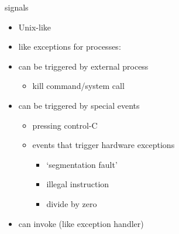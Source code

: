 \begin{frame}{signals}
\begin{itemize}
\item Unix-like 
\item like exceptions for processes:
\vspace{.5cm}
\item can be triggered by external process
    \begin{itemize}
    \item kill command/system call
    \end{itemize}
\item can be triggered by special events
    \begin{itemize}
    \item pressing control-C
    \item events that trigger hardware exceptions
        \begin{itemize}
        \item `segmentation fault'
        \item illegal instruction
        \item divide by zero
        \end{itemize}
    \end{itemize}
\item can invoke  (like exception handler)
\end{itemize}
\end{frame}


